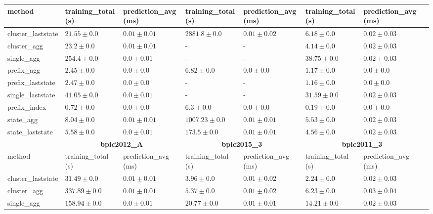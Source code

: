 \documentclass[twoside,11pt]{Latex/Classes/PhDthesisPSnPDF}
\begin{document}
\begin{table}[!htbp]
{\begin{tabular}{llllllll}
					method  & training\_total (s) & prediction\_avg (ms) & training\_total (s) & prediction\_avg (ms) & training\_total (s) & prediction\_avg (ms) \\ \midrule
					cluster\_laststate & $21.55 \pm 0.0$ & $0.01 \pm 0.01$ & $2881.8 \pm 0.0$ & $0.01 \pm 0.02$ & $6.18 \pm 0.0$ & $0.02 \pm 0.03$ \\ 
					cluster\_agg & $23.2 \pm 0.0$ & $0.01 \pm 0.01$ & - & - & $4.14 \pm 0.0$ & $0.02 \pm 0.03$ \\ 
					single\_agg & $254.4 \pm 0.0$ & $\mathbf{0.0 \pm 0.01}$ & - & - & $38.75 \pm 0.0$ & $0.02 \pm 0.03$ \\ 
					prefix\_agg & $2.45 \pm 0.0$ & $\mathbf{0.0 \pm 0.0}$ & $6.82 \pm 0.0$ & $\mathbf{0.0 \pm 0.0}$ & $1.17 \pm 0.0$ & $\mathbf{0.0 \pm 0.0}$ \\ 
					prefix\_laststate & $2.47 \pm 0.0$ & $\mathbf{0.0 \pm 0.0}$ & - & - & $1.16 \pm 0.0$ & $\mathbf{0.0 \pm 0.0}$ \\ 
					single\_laststate & $41.05 \pm 0.0$ & $\mathbf{0.0 \pm 0.01}$ & - & - & $31.59 \pm 0.0$ & $0.02 \pm 0.03$ \\ 
					prefix\_index & $\mathbf{0.72 \pm 0.0}$ & $\mathbf{0.0 \pm 0.0}$ & $\mathbf{6.3 \pm 0.0}$ & $\mathbf{0.0 \pm 0.0}$ & $\mathbf{0.19 \pm 0.0}$ & $\mathbf{0.0 \pm 0.0}$ \\ 
					state\_agg & $8.04 \pm 0.0$ & $0.01 \pm 0.01$ & $1007.23 \pm 0.0$ & $0.01 \pm 0.01$ & $5.53 \pm 0.0$ & $0.02 \pm 0.03$ \\ 
					state\_laststate & $5.58 \pm 0.0$ & $\mathbf{0.0 \pm 0.01}$ & $173.5 \pm 0.0$ & $0.01 \pm 0.01$ & $4.56 \pm 0.0$ & $0.02 \pm 0.03$ \\ 
					\bottomrule
					\toprule
					& \multicolumn{2}{c}{{\bfseries bpic2012\_A}} & \multicolumn{2}{c}{{\bfseries bpic2015\_3}} & \multicolumn{2}{c}{{\bfseries bpic2011\_3}} \\ \cmidrule(lr){2-3} \cmidrule(lr){4-5} \cmidrule(lr){6-7}
					method  & training\_total (s) & prediction\_avg (ms) & training\_total (s) & prediction\_avg (ms) & training\_total (s) & prediction\_avg (ms) \\ \midrule
					cluster\_laststate & $31.49 \pm 0.0$ & $0.01 \pm 0.01$ & $3.96 \pm 0.0$ & $0.01 \pm 0.02$ & $2.24 \pm 0.0$ & $0.02 \pm 0.03$ \\ 
					cluster\_agg & $337.89 \pm 0.0$ & $0.01 \pm 0.01$ & $5.37 \pm 0.0$ & $0.01 \pm 0.02$ & $6.23 \pm 0.0$ & $0.03 \pm 0.04$ \\ 
					single\_agg & $158.94 \pm 0.0$ & $\mathbf{0.0 \pm 0.01}$ & $20.77 \pm 0.0$ & $0.01 \pm 0.01$ & $14.21 \pm 0.0$ & $0.02 \pm 0.03$ \\ 

\end{tabular}}
\end{table}
\end{document}
